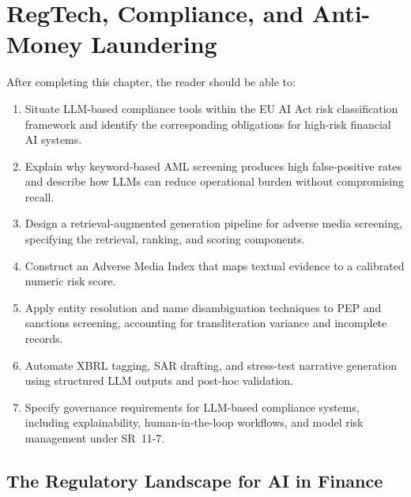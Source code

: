 \chapter{RegTech, Compliance, and Anti-Money Laundering}
\label{ch:regtech-compliance-aml}

\begin{remark}
After completing this chapter, the reader should be able to:
\begin{enumerate}
  \item Situate LLM-based compliance tools within the EU AI Act risk classification
        framework and identify the corresponding obligations for high-risk financial
        AI systems.
  \item Explain why keyword-based AML screening produces high false-positive rates
        and describe how LLMs can reduce operational burden without compromising
        recall.
  \item Design a retrieval-augmented generation pipeline for adverse media screening,
        specifying the retrieval, ranking, and scoring components.
  \item Construct an Adverse Media Index that maps textual evidence to a calibrated
        numeric risk score.
  \item Apply entity resolution and name disambiguation techniques to PEP and
        sanctions screening, accounting for transliteration variance and
        incomplete records.
  \item Automate XBRL tagging, SAR drafting, and stress-test narrative generation
        using structured LLM outputs and post-hoc validation.
  \item Specify governance requirements for LLM-based compliance systems, including
        explainability, human-in-the-loop workflows, and model risk management under
        SR~11-7.
\end{enumerate}
\end{remark}

\section{The Regulatory Landscape for AI in Finance}
\label{sec:ch11-regulatory-landscape}

